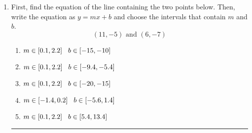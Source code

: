 \documentclass[14pt]{extbook}
\newcommand{\litem}[1]{\item#1\hspace*{-1cm}\rule{\textwidth}{0.4pt}}
\begin{document}
\begin{enumerate}
{\begin{enumerate}[label=\Alph*.]
\end{enumerate} }
\litem{
First, find the equation of the line containing the two points below. Then, write the equation as $ y=mx+b $ and choose the intervals that contain $m$ and $b$.\[ (11, -5) \text{ and } (6, -7) \]\begin{enumerate}[label=\Alph*.]
\item \( m \in [0.1, 2.2] \hspace*{3mm} b \in [-15, -10] \)
\item \( m \in [0.1, 2.2] \hspace*{3mm} b \in [-9.4, -5.4] \)
\item \( m \in [0.1, 2.2] \hspace*{3mm} b \in [-20, -15] \)
\item \( m \in [-1.4, 0.2] \hspace*{3mm} b \in [-5.6, 1.4] \)
\item \( m \in [0.1, 2.2] \hspace*{3mm} b \in [5.4, 13.4] \)

\end{enumerate} }
\end{enumerate}
\end{document}
